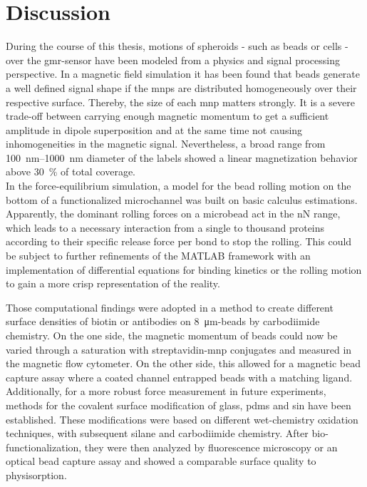 \chapter{Discussion}
During the course of this thesis, motions of spheroids - such as beads or cells - over the \gls{gmr}-sensor have been modeled from a physics and signal processing perspective. In a magnetic field simulation it has been found that beads generate a well defined signal shape if the \glspl{mnp} are distributed homogeneously over their respective surface. Thereby, the size of each \gls{mnp} matters strongly. It is a severe trade-off between carrying enough magnetic momentum to get a sufficient amplitude in dipole superposition and at the same time not causing inhomogeneities in the magnetic signal. Nevertheless, a broad range from \SIrange{100}{1000}{\nano\meter} diameter of the labels showed a linear magnetization behavior above \SI{30}{\percent} of total coverage.\\
In the force-equilibrium simulation, a model for the bead rolling motion on the bottom of a functionalized microchannel was built on basic calculus estimations. Apparently, the dominant rolling forces on a microbead act in the \si{\nano\newton} range, which leads to a necessary interaction from a single to thousand proteins according to their specific release force per bond to stop the rolling. This could be subject to further refinements of the MATLAB framework with an implementation of differential equations for binding kinetics \cite{lit:bio:BindingModeling} or the rolling motion to gain a more crisp representation of the reality. 

Those computational findings were adopted in a method to create different surface densities of biotin or antibodies on \SI{8}{\micro\meter}-beads by carbodiimide chemistry. On the one side, the magnetic momentum of beads could now be varied through a saturation with streptavidin-\gls{mnp} conjugates and measured in the magnetic flow cytometer. On the other side, this allowed for a magnetic bead capture assay where a coated channel entrapped beads with a matching ligand. Additionally, for a more robust force measurement in future experiments, methods for the covalent surface modification of glass, \gls{pdms} and \gls{sin} have been established. These modifications were based on different wet-chemistry oxidation techniques, with subsequent silane and carbodiimide chemistry. After bio-functionalization, they were then analyzed by fluorescence microscopy or an optical bead capture assay and showed a comparable surface quality to physisorption.

